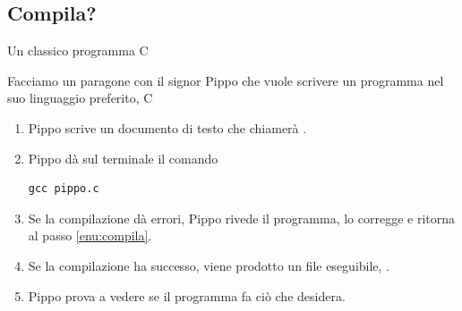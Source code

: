 \documentclass{beamer}
\begin{document}

\subsection{Compila?}

\begin{frame}[fragile]{\insertsubsection{} Un classico programma C}

Facciamo un paragone con il signor Pippo che vuole scrivere un programma
nel suo linguaggio preferito, C

\bigskip{}
\begin{enumerate}
\item Pippo scrive un documento di testo che chiamer\`a .
\item \label{enu:compila}Pippo d\`a sul terminale il comando
\begin{verbatim}
gcc pippo.c
\end{verbatim}
\item Se la compilazione d\`a errori, Pippo rivede il programma, lo corregge
e ritorna al passo \ref{enu:compila}.
\item Se la compilazione ha successo, viene prodotto un file eseguibile,
.
\item Pippo prova a vedere se il programma fa ci\`o che desidera.
\end{enumerate}
\end{frame}
\end{document}
